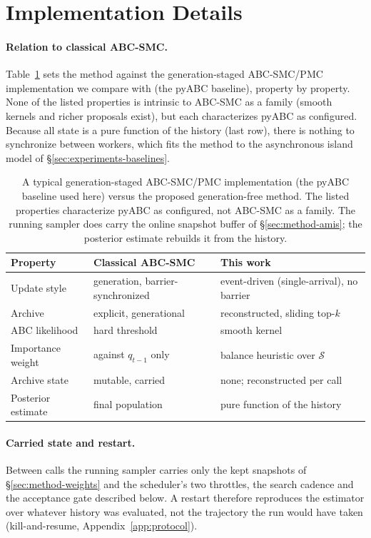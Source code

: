 \documentclass[10pt]{article}
\theoremstyle{plain}
\theoremstyle{definition}
\begin{document}
\section{Implementation Details}\label{app:implementation}

\paragraph{Relation to classical ABC-SMC.}\label{sec:method-comparison}
Table~\ref{tab:method-comparison} sets the method against the generation-staged ABC-SMC/PMC implementation we compare with (the pyABC baseline), property by property. None of the listed properties is intrinsic to ABC-SMC as a family (smooth kernels and richer proposals exist), but each characterizes pyABC as configured. Because all state is a pure function of the history (last row), there is nothing to synchronize between workers, which fits the method to the asynchronous island model of \S\ref{sec:experiments-baselines}.
\begin{table}[h]
\caption{A typical generation-staged ABC-SMC/PMC implementation (the pyABC baseline used here) versus the proposed generation-free method. The listed properties characterize pyABC as configured, not ABC-SMC as a family. The running sampler does carry the online snapshot buffer of \S\ref{sec:method-amis}; the posterior estimate rebuilds it from the history.}\label{tab:method-comparison}
\centering
\begin{tabular}{@{}lll@{}}
\toprule
Property & Classical ABC-SMC & This work \\
\midrule
Update style & generation, barrier-synchronized & event-driven (single-arrival), no barrier \\
Archive & explicit, generational & reconstructed, sliding top-$k$ \\
ABC likelihood & hard threshold & smooth kernel \\
Importance weight & against $q_{t-1}$ only & balance heuristic over $\mathcal{S}$ \\
Archive state & mutable, carried & none; reconstructed per call \\
Posterior estimate & final population & pure function of the history \\
\bottomrule
\end{tabular}
\end{table}

\paragraph{Carried state and restart.} Between calls the running sampler carries only the kept snapshots of \S\ref{sec:method-weights} and the scheduler's two throttles, the search cadence and the acceptance gate described below. A restart therefore reproduces the estimator over whatever history was evaluated, not the trajectory the run would have taken (kill-and-resume, Appendix~\ref{app:protocol}).
\end{document}

